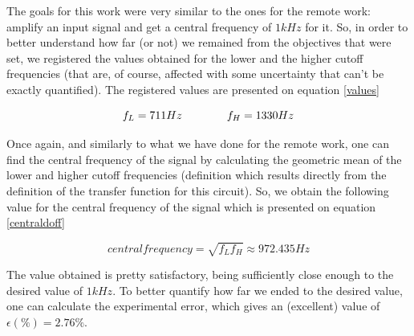 The goals for this work were very similar to the ones for the remote work: amplify an input signal and get a central frequency of $1kHz$ for it. So, in order to better understand how far (or not) we remained from the objectives that were set, we registered the values obtained for the lower and the higher cutoff frequencies (that are, of course, affected with some uncertainty that can't be exactly quantified). The registered values are presented on equation \eqref{values}

\begin{equation}
    f_L = 711Hz \hspace{40px} f_H = 1330Hz
    \label{values}
\end{equation}

Once again, and similarly to what we have done for the remote work, one can find the central frequency of the signal by calculating the geometric mean of the lower and higher cutoff frequencies (definition which results directly from the definition of the transfer function for this circuit). So, we obtain the following value for the central frequency of the signal which is presented on equation \eqref{centraldoff}

\begin{equation}
    central frequency = \sqrt{f_L f_H} \approx 972.435Hz
    \label{centraldoff}
\end{equation}

The value obtained is pretty satisfactory, being sufficiently close enough to the desired value of $1kHz$. To better quantify how far we ended to the desired value, one can calculate the experimental error, which gives an (excellent) value of $\epsilon (\%) = 2.76\%$.